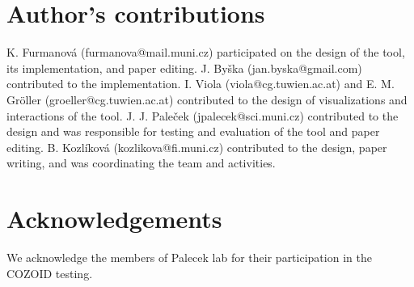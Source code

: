 \documentclass{bmcart}
\begin{document}
\begin{backmatter}
\section*{Author's contributions}
K. Furmanov\'{a} (furmanova@mail.muni.cz) participated on the design of the tool, its implementation, and paper editing.  J. By\v{s}ka (jan.byska@gmail.com) contributed to the implementation. I. Viola (viola@cg.tuwien.ac.at) and E. M. Gr\"{o}ller (groeller@cg.tuwien.ac.at) contributed to the design of visualizations and interactions of the tool. J. J. Pale\v{c}ek (jpalecek@sci.muni.cz) contributed to the design and was responsible for testing and evaluation of the tool and paper editing. B. Kozl\'{i}kov\'{a} (kozlikova@fi.muni.cz) contributed to the design, paper writing, and was coordinating the team and activities.

\section*{Acknowledgements}
We acknowledge the members of Palecek lab for their participation in the COZOID testing. 





\end{backmatter}
\end{document}
